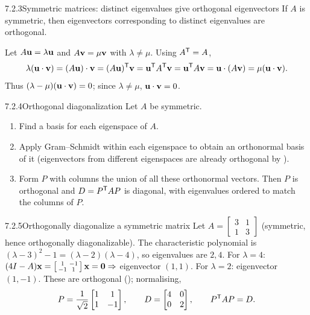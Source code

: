 \begin{thms}{7.2.3}{Symmetric matrices: distinct eigenvalues give orthogonal eigenvectors}
If $A$ is symmetric, then eigenvectors corresponding to distinct eigenvalues are orthogonal.
\end{thms}

\begin{prf}
Let $A\mathbf{u}=\lambda\mathbf{u}$ and $A\mathbf{v}=\mu\mathbf{v}$ with $\lambda\neq\mu$. Using $A^{\mathsf{T}}=A$,
\[
\lambda(\mathbf{u}\cdot\mathbf{v})=(A\mathbf{u})\cdot\mathbf{v}=(A\mathbf{u})^{\mathsf{T}}\mathbf{v}=\mathbf{u}^{\mathsf{T}} A^{\mathsf{T}}\mathbf{v}=\mathbf{u}^{\mathsf{T}} A\mathbf{v}=\mathbf{u}\cdot(A\mathbf{v})=\mu(\mathbf{u}\cdot\mathbf{v}).
\]
Thus $(\lambda-\mu)(\mathbf{u}\cdot\mathbf{v})=0$; since $\lambda\neq\mu$, $\mathbf{u}\cdot\mathbf{v}=0$.
\end{prf}

\begin{algs}{7.2.4}{Orthogonal diagonalization}
Let $A$ be symmetric.
\begin{enumerate}[label=\textup{(\roman*)},leftmargin=2.4em,itemsep=1pt]
\item Find a basis for each eigenspace of $A$.
\item Apply Gram--Schmidt within each eigenspace to obtain an orthonormal basis of it (eigenvectors from different eigenspaces are already orthogonal by ).
\item Form $P$ with columns the union of all these orthonormal vectors. Then $P$ is orthogonal and $D=P^{\mathsf{T}} AP$ is diagonal, with eigenvalues ordered to match the columns of $P$.
\end{enumerate}
\end{algs}

\begin{exmp}{7.2.5}{Orthogonally diagonalize a symmetric matrix}
Let $A=\left[\begin{smallmatrix}3&1\\1&3\end{smallmatrix}\right]$ (symmetric, hence orthogonally diagonalizable). The characteristic polynomial is $(\lambda-3)^2-1=(\lambda-2)(\lambda-4)$, so eigenvalues are $2,4$. For $\lambda=4$: $(4I-A)\mathbf{x}=\left[\begin{smallmatrix}1&-1\\-1&1\end{smallmatrix}\right]\mathbf{x}=\mathbf{0}\Rightarrow$ eigenvector $(1,1)$. For $\lambda=2$: eigenvector $(1,-1)$. These are orthogonal (); normalising,
\[
P=\frac{1}{\sqrt2}\begin{bmatrix}1&1\\1&-1\end{bmatrix},\qquad D=\begin{bmatrix}4&0\\0&2\end{bmatrix},\qquad P^{\mathsf{T}} AP=D.
\]
\end{exmp}

